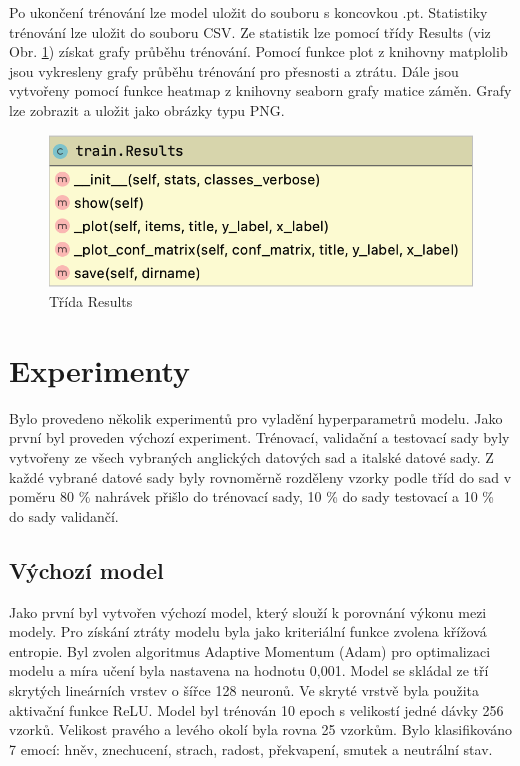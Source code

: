 \documentclass[FM,BP]{tulthesis}
\begin{document}
Po ukončení trénování lze model uložit do souboru s koncovkou .pt. Statistiky trénování lze uložit do souboru CSV. Ze statistik lze pomocí třídy Results (viz Obr. \ref{fig:results}) získat grafy průběhu trénování. Pomocí funkce plot z knihovny matplolib jsou vykresleny grafy průběhu trénování pro přesnosti a ztrátu. Dále jsou vytvořeny pomocí funkce heatmap z knihovny seaborn grafy matice záměn. Grafy lze zobrazit a uložit jako obrázky typu PNG.

\begin{figure}[ht]
\centerline{\includegraphics[scale=.3]{train-results.png}}
\caption{Třída Results}
\label{fig:results}
\end{figure}
\FloatBarrier

\chapter{Experimenty}
Bylo provedeno několik experimentů pro vyladění hyperparametrů modelu. Jako první byl proveden výchozí experiment. Trénovací, validační a testovací sady byly vytvořeny ze všech vybraných anglických datových sad a italské datové sady. Z každé vybrané datové sady byly rovnoměrně rozděleny vzorky podle tříd do sad v poměru 80 \% nahrávek přišlo do trénovací sady, 10 \% do sady testovací a 10 \% do sady validančí.

\section{Výchozí model}
Jako první byl vytvořen výchozí model, který slouží k porovnání výkonu mezi modely. Pro získání ztráty modelu byla jako kriteriální funkce zvolena křížová entropie. Byl zvolen algoritmus Adaptive Momentum (Adam) pro optimalizaci modelu a míra učení byla nastavena na hodnotu 0,001. Model se skládal ze tří skrytých lineárních vrstev o šířce 128 neuronů. Ve skryté vrstvě byla použita aktivační funkce ReLU. Model byl trénován 10 epoch s velikostí jedné dávky 256 vzorků. Velikost pravého a levého okolí byla rovna 25 vzorkům. Bylo klasifikováno 7 emocí: hněv, znechucení, strach, radost, překvapení, smutek a neutrální stav.
\end{document}
